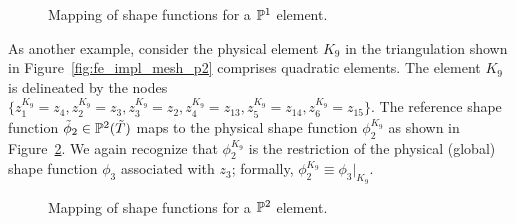 
\begin{figure}
  \centering
  \caption{Mapping of shape functions for a $\mathbb{P}^1$ element.}
  \label{fig:fe_impl_shape_map_p1}
\end{figure}


As another example, consider the physical element $K_9$ in the triangulation shown in Figure~\ref{fig:fe_impl_mesh_p2} comprises quadratic elements. The element $K_9$ is delineated by the nodes $\{ z^{K_9}_1 = z_4, z^{K_9}_2 = z_3, z^{K_9}_3 = z_2,  z^{K_9}_4 = z_{13},  z^{K_9}_5 = z_{14},  z^{K_9}_6 = z_{15} \}$.  The reference shape function $\tilde \phi_2 \in \mathbb{P}^2(\tilde T)$ maps to the physical shape function $\phi_2^{K_9}$ as shown in Figure~\ref{fig:fe_impl_shape_map_p2}.  We again recognize that $\phi_2^{K_9}$ is the restriction of the physical (global) shape function $\phi_3$ associated with $z_3$; formally, $\phi_2^{K_9} \equiv \phi_3|_{K_9}$.

\begin{figure}
  \centering
  \caption{Mapping of shape functions for a $\mathbb{P}^2$ element.}
  \label{fig:fe_impl_shape_map_p2}
\end{figure}

